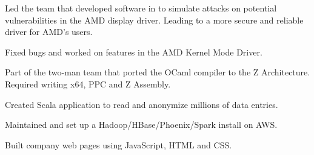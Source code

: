 \documentclass[letterpaper]{deedy-resume-modified} %
\begin{document}
\begin{minipage}[t]{0.66\textwidth}
\sectionspace %



\vspace{\topsep}
\begin{tightitemize}
\vspace{-10pt}
\item Led the team that developed software in \CPP \hspace{1pt} to simulate attacks on potential vulnerabilities in the AMD display driver.  Leading to a more secure and reliable driver for AMD's users.
\item Fixed bugs and worked on features in the AMD Kernel Mode Driver.
\end{tightitemize}

\sectionspace %



\begin{tightitemize}
\item Part of the two-man team that ported the OCaml compiler to the Z Architecture. Required writing x64, PPC and Z Assembly.
\end{tightitemize}

\sectionspace %



\begin{tightitemize}
\item Created Scala application to read and anonymize millions of data entries.
\item Maintained and set up a Hadoop/HBase/Phoenix/Spark install on AWS.
\item Built company web pages using JavaScript, HTML and CSS.
\end{tightitemize}

\sectionspace %




\end{minipage}
\end{document}
